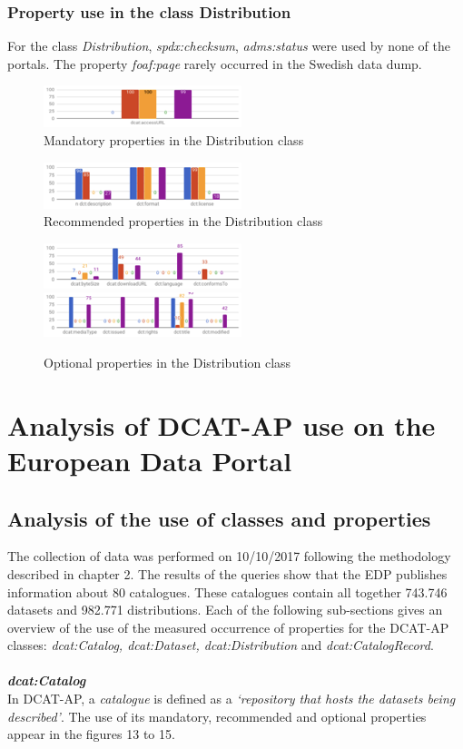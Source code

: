 \documentclass[<options>]{elsarticle}
\begin{document}
\subsubsection{Property use in the class Distribution}
For the class \textit{Distribution}, \textit{spdx:checksum}, \textit{adms:status} were used by none of the portals. The property \textit{foaf:page} rarely occurred in the Swedish data dump.

\begin{figure}[!h]
\includegraphics{replace12.png}
\caption{Mandatory properties in the Distribution class}
\end{figure}

\begin{figure}[!h]
\includegraphics{replace13.png}
\caption{Recommended properties in the Distribution class}
\end{figure}

\begin{figure}[!h]
\includegraphics{replace14.png}
\includegraphics{replace15.png}
\caption{Optional properties in the Distribution class}
\end{figure}

\section{Analysis of DCAT-AP use on the European Data Portal}

\subsection{Analysis of the use of classes and properties}
The collection of data was performed on 10/10/2017 following the methodology described in chapter 2. The results of the queries show that the EDP publishes information about 80 catalogues. These catalogues contain all together 743.746 datasets and 982.771 distributions. Each of the following sub-sections gives an overview of the use of the measured occurrence of properties for the DCAT-AP classes: \textit{dcat:Catalog, dcat:Dataset, dcat:Distribution} and \textit{dcat:CatalogRecord}.
\\
\\
\textbf{\textit{dcat:Catalog}}
\\
In DCAT-AP, a \textit{catalogue} is defined as a \textit{‘repository that hosts the datasets being described’}. The use of its mandatory, recommended and optional properties appear in the figures 13 to 15.
\end{document}
